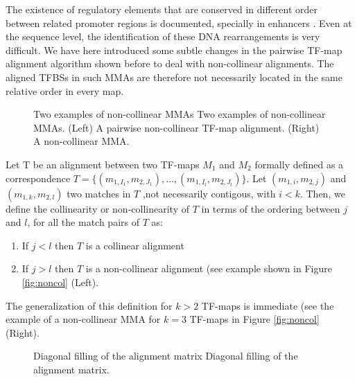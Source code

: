 The existence of regulatory elements that are conserved in different order
between related promoter regions is documented, specially in enhancers
\citep{nix:2005a}. Even at the sequence level, the identification of these
DNA rearrangements is very difficult.
We have here introduced some subtle changes in the pairwise TF-map 
alignment algorithm shown before to deal with non-collinear alignments.
The aligned TFBSs in such MMAs are therefore not necessarily located in
the same relative order in every map.

\begin{figure}[t!]
\begin{center}
\setlength{\fboxsep}{0pt}
          {Two examples of non-collinear MMAs}%
          {Two examples of non-collinear MMAs.}%
          {(Left) A pairwise non-collinear TF-map alignment. (Right) A non-collinear MMA.}
\end{center}
\end{figure}


Let T be an alignment between two TF-maps $M_1$ and $M_2$ formally defined as
a correspondence $T=\{(m_{1,I_1},m_{2,J_1}), \ldots, (m_{1,I_t},m_{2,J_t}) \}$.
Let $(m_{1,i},m_{2,j})$ and $(m_{1,k},m_{2,l})$ two matches in $T$
,not necessarily contigous, with $i<k$. Then, we define the collinearity or
non-collinearity of $T$ in terms of the ordering between $j$ and $l$,
for all the match pairs of $T$ as:

\begin{enumerate}
\item
If $j<l$ then $T$ is a collinear alignment
\item
If $j>l$ then $T$ is a non-collinear alignment
(see example shown in Figure \ref{fig:noncol} (Left).
\end{enumerate}

The generalization of this definition for $k>2$ TF-maps is immediate
(see the example of a non-collinear MMA for $k=3$ TF-maps in Figure
\ref{fig:noncol} (Right).

\begin{figure}[t!]
\begin{center}
\setlength{\fboxsep}{0pt}
          {Diagonal filling of the alignment matrix}%
          {Diagonal filling of the alignment matrix.}%
          {}
\end{center}
\end{figure}


